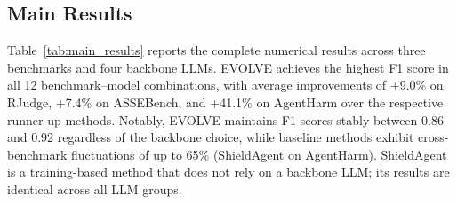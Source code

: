\begin{appendices}
% 







\section{Main Results}
\label{appendix:main_results}
Table~\ref{tab:main_results} reports the complete numerical results across three benchmarks and four backbone LLMs. EVOLVE achieves the highest F1 score in all 12 benchmark--model combinations, with average improvements of +9.0\% on RJudge, +7.4\% on ASSEBench, and +41.1\% on AgentHarm over the respective runner-up methods. Notably, EVOLVE maintains F1 scores stably between 0.86 and 0.92 regardless of the backbone choice, while baseline methods exhibit cross-benchmark fluctuations of up to 65\% (ShieldAgent on AgentHarm). ShieldAgent is a training-based method that does not rely on a backbone LLM; its results are identical across all LLM groups.



\end{appendices}

